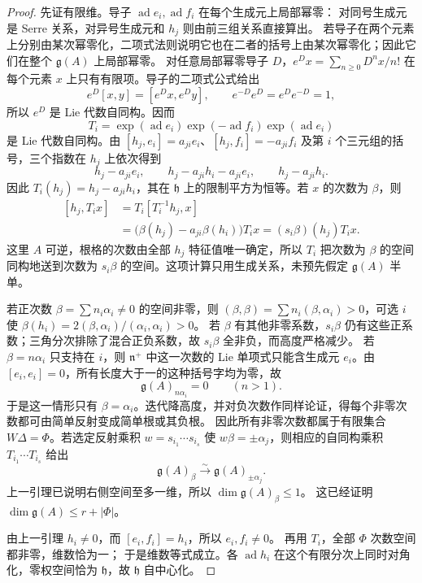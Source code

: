 \begin{proof}
	先证有限维。导子 \(\operatorname{ad}e_i,\operatorname{ad}f_i\) 在每个生成元上局部幂零： 对同号生成元是 Serre 关系，对异号生成元和 \(h_j\) 则由前三组关系直接算出。 若导子在两个元素上分别由某次幂零化，二项式法则说明它也在二者的括号上由某次幂零化；因此它们在整个 \(\mathfrak g(A)\) 上局部幂零。 对任意局部幂零导子 \(D\)，\(e^D x=\sum_{n\ge0}D^nx/n!\) 在每个元素 \(x\) 上只有有限项。导子的二项式公式给出
	\[
		e^D[x,y]=[e^Dx,e^Dy],\qquad e^{-D}e^D=e^De^{-D}=1,
	\]
	所以 \(e^D\) 是 Lie 代数自同构。因而
	\[
		T_i=\exp(\operatorname{ad}e_i) \exp(-\operatorname{ad}f_i) \exp(\operatorname{ad}e_i)
	\]
	是 Lie 代数自同构。由 \([h_j,e_i]=a_{ji}e_i\)、\([h_j,f_i]=-a_{ji}f_i\) 及第 \(i\) 个三元组的括号，三个指数在 \(h_j\) 上依次得到
	\[
		h_j-a_{ji}e_i,\qquad h_j-a_{ji}h_i-a_{ji}e_i,\qquad h_j-a_{ji}h_i.
	\]
	因此 \(T_i(h_j)=h_j-a_{ji}h_i\)，其在 \(\mathfrak h\) 上的限制平方为恒等。若 \(x\) 的次数为 \(\beta\)，则
	\[
		\begin{aligned}
			[h_j,T_ix]&=T_i[T_i^{-1}h_j,x]\\
			&=\bigl(\beta(h_j)-a_{ji}\beta(h_i)\bigr)T_ix =(s_i\beta)(h_j)T_ix.
		\end{aligned}
	\]
	这里 \(A\) 可逆，根格的次数由全部 \(h_j\) 特征值唯一确定，所以 \(T_i\) 把次数为 \(\beta\) 的空间同构地送到次数为 \(s_i\beta\) 的空间。这项计算只用生成关系，未预先假定 \(\mathfrak g(A)\) 半单。

	若正次数 \(\beta=\sum n_i\alpha_i\ne0\) 的空间非零，则 \((\beta,\beta)=\sum n_i(\beta,\alpha_i)>0\)，可选 \(i\) 使 \(\beta(h_i)=2(\beta,\alpha_i)/(\alpha_i,\alpha_i)>0\)。 若 \(\beta\) 有其他非零系数，\(s_i\beta\) 仍有这些正系数；三角分次排除了混合正负系数，故 \(s_i\beta\) 全非负，而高度严格减少。 若 \(\beta=n\alpha_i\) 只支持在 \(i\)，则 \(\mathfrak n^+\) 中这一次数的 Lie 单项式只能含生成元 \(e_i\)。由 \([e_i,e_i]=0\)，所有长度大于一的这种括号字均为零，故
	\[
		\mathfrak g(A)_{n\alpha_i}=0\qquad(n>1).
	\]
	于是这一情形只有 \(\beta=\alpha_i\)。迭代降高度，并对负次数作同样论证，得每个非零次数都可由简单反射变成简单根或其负根。 因此所有非零次数都属于有限集合 \(W\Delta=\Phi\)。若选定反射乘积 \(w=s_{i_1}\cdots s_{i_s}\) 使 \(w\beta=\pm\alpha_j\)，则相应的自同构乘积 \(T_{i_1}\cdots T_{i_s}\) 给出
	\[
		\mathfrak g(A)_\beta\xrightarrow{\sim}\mathfrak g(A)_{\pm\alpha_j}.
	\]
	上一引理已说明右侧空间至多一维，所以 \(\dim\mathfrak g(A)_\beta\le1\)。 这已经证明 \(\dim\mathfrak g(A)\leq r+|\Phi|\)。

	由上一引理 \(h_i\ne0\)，而 \([e_i,f_i]=h_i\)，所以 \(e_i,f_i\ne0\)。 再用 \(T_i\)，全部 \(\Phi\) 次数空间都非零，维数恰为一； 于是维数等式成立。各 \(\operatorname{ad}h_i\) 在这个有限分次上同时对角化，零权空间恰为 \(\mathfrak h\)，故 \(\mathfrak h\) 自中心化。


\end{proof}
